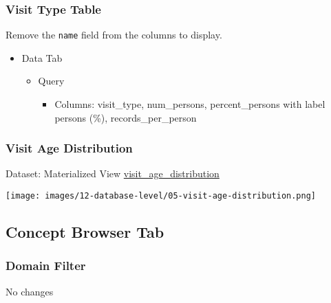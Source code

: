 \documentclass[
]{book}
\providecommand{\tightlist}{%
  \setlength{\itemsep}{0pt}\setlength{\parskip}{0pt}}
\begin{document}
\hypertarget{visit-type-table}{%
\subsubsection*{Visit Type Table}\label{visit-type-table}}

Remove the \texttt{name} field from the columns to display.

\begin{itemize}
\tightlist
\item
  Data Tab

  \begin{itemize}
  \tightlist
  \item
    Query

    \begin{itemize}
    \tightlist
    \item
      Columns: visit\_type, num\_persons, percent\_persons with label persons (\%), records\_per\_person
    \end{itemize}
  \end{itemize}
\end{itemize}

\hypertarget{visit-age-distribution}{%
\subsubsection*{Visit Age Distribution}\label{visit-age-distribution}}

Dataset: Materialized View \href{materialized-views-1.html\#visit_age_distribution}{visit\_age\_distribution}

\texttt{[image: images/12-database-level/05-visit-age-distribution.png]}

\hypertarget{concept-browser-tab-1}{%
\subsection*{Concept Browser Tab}\label{concept-browser-tab-1}}

\hypertarget{domain-filter-1}{%
\subsubsection*{Domain Filter}\label{domain-filter-1}}

No changes
\end{document}
